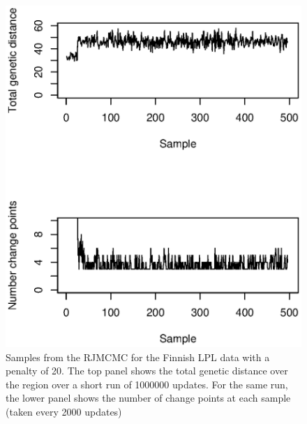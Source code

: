 \documentclass[a4paper,10pt,fullpage]{article}
\begin{document}
\begin{figure}
\linespread{1.3} \centering
\includegraphics[scale=1.0]{LPLsamples.eps}
\caption{Samples from the RJMCMC for the Finnish LPL data with a
penalty of 20. The top panel shows the total genetic distance over
the region over a short run of 1000000 updates.  For the same run,
the lower panel shows the number of change points at each sample
(taken every 2000 updates)} \label{fig:lpl_samples}
\end{figure}
\end{document}
